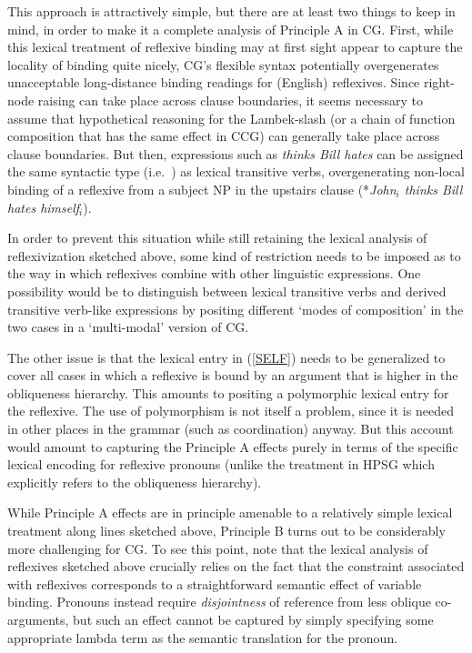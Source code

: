 \documentclass[output=paper]{langsci/langscibook}
\begin{document}
\begin{exe}
 \ex\label{SELF}
\end{exe}

This approach is attractively simple, but there are at least two
things to keep in mind, in order to make it a complete analysis of
Principle A in CG. First, while this 
lexical treatment of reflexive binding may at first sight 
appear to capture the locality of binding quite nicely, CG's flexible
syntax potentially overgenerates unacceptable long-distance binding
readings for (English) reflexives. Since right-node raising can take
place across clause boundaries,  it seems necessary to
assume that hypothetical reasoning for the Lambek-slash
(or a chain of function composition that has the same effect in CCG)
can generally take place across clause boundaries. But then,
expressions such as \textit{thinks Bill hates} can be assigned
the same syntactic type (i.e.\  ) as lexical transitive verbs,
overgenerating non-local binding of a reflexive from a subject NP in
the upstairs clause (*\textit{John\ensuremath{_i} thinks Bill hates {himself\ensuremath{_i}}}).

In order to prevent this situation while still retaining the lexical
analysis of reflexivization sketched above, some kind of restriction
needs to be imposed as to the way in which reflexives combine with
other linguistic expressions. One possibility would be to distinguish
between lexical transitive verbs and derived transitive verb-like
expressions by positing different `modes of composition' in the two
cases in a `multi-modal' version of CG.

The other issue is that the lexical entry in (\ref{SELF}) needs to be
generalized to cover all cases in which a reflexive is bound by an
argument that is higher in the obliqueness hierarchy. This amounts to
positing a polymorphic lexical entry for the reflexive. The use of
polymorphism is not itself a problem, since it is needed in other
places in the grammar (such as coordination) anyway. But this account
would amount to capturing the Principle A effects purely in terms of the 
specific lexical encoding for reflexive pronouns (unlike the treatment
in HPSG which explicitly refers to the obliqueness hierarchy).

While Principle A effects are in principle amenable to a 
relatively simple lexical treatment along lines sketched above, Principle B turns out to be
considerably more challenging for CG. To see this point, note that the
lexical analysis of reflexives sketched above crucially relies on the
fact that the constraint associated with reflexives corresponds to a
straightforward semantic effect of variable binding. Pronouns instead
require \emph{disjointness} of reference from less oblique co-arguments, but
such an effect cannot be captured by simply specifying some
appropriate lambda term as the semantic translation for the pronoun.
\end{document}
